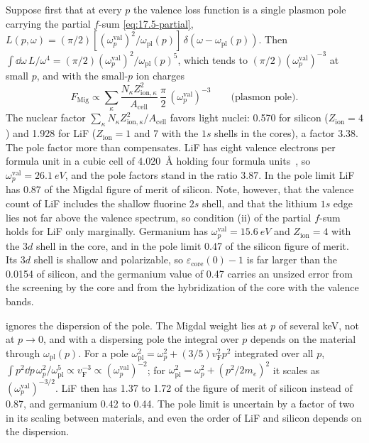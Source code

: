 Suppose first that at every $p$ the valence loss function is a single plasmon pole carrying the partial $f$-sum \cref{eq:17.5-partial}, $L(p,\omega) = (\pi/2)[(\omega_p^{\mathrm{val}})^2/\omega_{\mathrm{pl}}(p)]\,\delta(\omega - \omega_{\mathrm{pl}}(p))$. Then $\int\dd\omega\,L/\omega^4 = (\pi/2)(\omega_p^{\mathrm{val}})^2/\omega_{\mathrm{pl}}(p)^5$, which tends to $(\pi/2)(\omega_p^{\mathrm{val}})^{-3}$ at small $p$, and with the small-$p$ ion charges
\begin{equation}
  F_{\mathrm{Mig}} \propto \sum_\kappa\frac{N_\kappa Z_{\mathrm{ion},\kappa}^2}{A_{\mathrm{cell}}}\,\frac{\pi}{2}\,(\omega_p^{\mathrm{val}})^{-3}
  \qquad\text{(plasmon pole)} .
  \label{eq:17.5-pole}
\end{equation}
The nuclear factor $\sum_\kappa N_\kappa Z_{\mathrm{ion},\kappa}^2/A_{\mathrm{cell}}$ favors light nuclei: 0.570 for silicon ($Z_{\mathrm{ion}} = 4$) and 1.928 for LiF ($Z_{\mathrm{ion}} = 1$ and 7 with the $1s$ shells in the cores), a factor 3.38. The pole factor more than compensates. LiF has eight valence electrons per formula unit in a cubic cell of \SI{4.020}{\angstrom} holding four formula units~\cite[Table~III]{griffin2020multichannel}, so $\omega_p^{\mathrm{val}} = \SI{26.1}{eV}$, and the pole factors stand in the ratio 3.87. In the pole limit LiF has 0.87 of the Migdal figure of merit of silicon. Note, however, that the valence count of LiF includes the shallow fluorine $2s$ shell, and that the lithium $1s$ edge lies not far above the valence spectrum, so condition (ii) of the partial $f$-sum holds for LiF only marginally. Germanium has $\omega_p^{\mathrm{val}} = \SI{15.6}{eV}$ and $Z_{\mathrm{ion}} = 4$ with the $3d$ shell in the core, and in the pole limit 0.47 of the silicon figure of merit. Its $3d$ shell is shallow and polarizable, so $\varepsilon_{\mathrm{core}}(0) - 1$ is far larger than the 0.0154 of silicon, and the germanium value of 0.47 carries an unsized error from the screening by the core and from the hybridization of the core with the valence bands.

 ignores the dispersion of the pole. The Migdal weight lies at $p$ of several keV, not at $p \to 0$, and with a dispersing pole the integral over $p$ depends on the material through $\omega_{\mathrm{pl}}(p)$. For a pole $\omega_{\mathrm{pl}}^2 = \omega_p^2 + (3/5)v_{\mathrm{F}}^2p^2$ integrated over all $p$, $\int p^2\dd p\,\omega_p^2/\omega_{\mathrm{pl}}^5 \propto v_{\mathrm{F}}^{-3} \propto (\omega_p^{\mathrm{val}})^{-2}$; for $\omega_{\mathrm{pl}}^2 = \omega_p^2 + (p^2/2m_e)^2$ it scales as $(\omega_p^{\mathrm{val}})^{-3/2}$. LiF then has 1.37 to 1.72 of the figure of merit of silicon instead of 0.87, and germanium 0.42 to 0.44. The pole limit is uncertain by a factor of two in its scaling between materials, and even the order of LiF and silicon depends on the dispersion.

